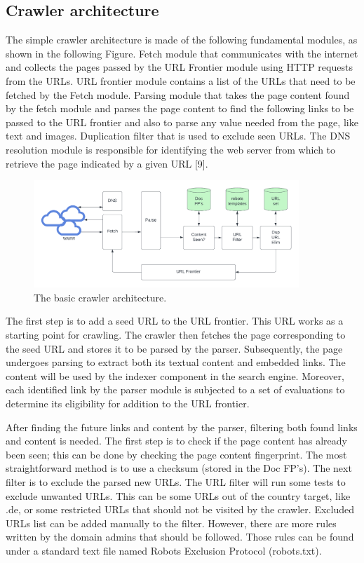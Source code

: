 \subsection{Crawler architecture}

The simple crawler architecture is made of the following fundamental modules, as shown in the following Figure. Fetch module that communicates with the internet and collects the pages passed by the URL Frontier module using HTTP requests from the URLs. URL frontier module contains a list of the URLs that need to be fetched by the Fetch module. Parsing module that takes the page content found by the fetch module and parses the page content to find the following links to be passed to the URL frontier and also to parse any value needed from the page, like text and images. Duplication filter that is used to exclude seen URLs. The DNS resolution module is responsible for identifying the web server from which to retrieve the page indicated by a given URL [9]. 

\begin{figure}[h]	
     \centering
     \includegraphics[width=10cm]{images/crawler_architecture.png}
     \caption{The basic crawler architecture.}
     \label{fig:google-arch}
\end{figure}

The first step is to add a seed URL to the URL frontier. This URL works as a starting point for crawling. The crawler then fetches the page corresponding to the seed URL and stores it to be parsed by the parser. Subsequently, the page undergoes parsing to extract both its textual content and embedded links. The content will be used by the indexer component in the search engine. Moreover, each identified link by the parser module is subjected to a set of evaluations to determine its eligibility for addition to the URL frontier.

After finding the future links and content by the parser, filtering both found links and content is needed. The first step is to check if the page content has already been seen; this can be done by checking the page content fingerprint. The most straightforward method is to use a checksum (stored in the Doc FP's). The next filter is to exclude the parsed new URLs. The URL filter will run some tests to exclude unwanted URLs. This can be some URLs out of the country target, like .de, or some restricted URLs that should not be visited by the crawler. Excluded URLs list can be added manually to the filter. However, there are more rules written by the domain admins that should be followed. Those rules can be found under a standard text file named Robots Exclusion Protocol (robots.txt). 

